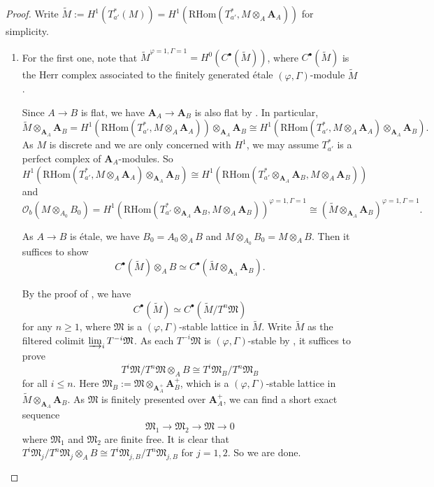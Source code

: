 \documentclass[10pt]{article}
\numberwithin{equation}{section}
\newcommand{\frakM}{{\mathfrak M}}
\newcommand{\calO}{{\mathcal O}}
\newcommand{\bfA}{{\textbf{A}}}
\newcommand{\RHom}{{\mathrm{RHom}}}
\begin{document}
\begin{proof}
Write $\tilde M:=H^1(T^*_{a'}(M))=H^1(\RHom(T^*_{a'},M\otimes_{A}\bfA_A))$ for simplicity.
    \begin{enumerate}
        \item For the first one, note that $\tilde M^{\varphi=1,\Gamma=1}=H^0(C^{\bullet}(\tilde M))$, where $C^{\bullet}(\tilde M)$ is the Herr complex associated to the finitely generated \'etale $(\varphi,\Gamma)$-module $\tilde M$. 
        
        Since $A\to B$ is flat, we have $\bfA_A\to \bfA_B$ is also flat by \cite[Proposition 2.2.4]{EG22}. In particular, 
        \[
      \tilde M\otimes_{\bfA_A}\bfA_B=  H^1(\RHom(T^*_{a'},M\otimes_{A}\bfA_A))\otimes_{\bfA_A}\bfA_B\cong H^1(\RHom(T^*_{a'},M\otimes_{A}\bfA_A)\otimes_{\bfA_A}\bfA_B).
        \]
        As $M$ is discrete and we are only concerned with $H^1$, we may assume $T^*_{a'}$ is a perfect complex of $\bfA_A$-modules. So 
        \[
        H^1(\RHom(T^*_{a'},M\otimes_{A}\bfA_A)\otimes_{\bfA_A}\bfA_B)\cong H^1(\RHom(T^*_{a'}\otimes_{\bfA_A}\bfA_B,M\otimes_{A}\bfA_B))
        \]
   and
        \[
        \calO_b(M\otimes_{A_0}B_0)=H^1(\RHom(T^*_{a'}\otimes_{\bfA_A}\bfA_B,M\otimes_{A}\bfA_B))^{\varphi=1,\Gamma=1}\cong (\tilde M\otimes_{\bfA_A}\bfA_B)^{\varphi=1,\Gamma=1}.
        \]
        
As $A\to B$ is \'etale, we have $B_0=A_0\otimes_AB$ and $M\otimes_{A_0}B_0=M\otimes_AB$. Then it suffices to show 
        \[
        C^{\bullet}(\tilde M)\otimes_AB\simeq  C^{\bullet}(\tilde M\otimes_{\bfA_A}\bfA_B).
        \]

       By the proof of \cite[Theorem 5.1.22]{EG22}, we have
        \[
        C^{\bullet}(\tilde M)\simeq C^{\bullet}(\tilde M/T^n\frakM)
        \]
        for any $n\geq 1$, where $\frakM$ is a $(\varphi,\Gamma)$-stable lattice in $\tilde M$.  Write $\tilde M$ as the filtered colimit $\varinjlim_iT^{-i}\frakM$. As each $T^{-i}\frakM$ is $(\varphi,\Gamma)$-stable by \cite[Lemma 5.1.6]{EG22}, it suffices to prove
        \[
        T^i\frakM/T^n\frakM\otimes_AB\cong T^i\frakM_B/T^n\frakM_B
        \]
        for all $i\leq n$. Here $\frakM_B:=\frakM\otimes_{\bfA_A^+}\bfA_B^+$, which is a $(\varphi,\Gamma)$-stable lattice in $\tilde M\otimes_{\bfA_A}\bfA_B$. As $\frakM$ is finitely presented over $\bfA_A^+$, we can find a short exact sequence
        \[
        \frakM_1\to \frakM_2\to \frakM\to 0
        \]
        where $\frakM_1$ and $\frakM_2$ are finite free. It is clear that $T^i\frakM_j/T^n\frakM_j\otimes_AB\cong T^i\frakM_{j,B}/T^n\frakM_{j,B}$ for $j=1,2$.  So we are done.


\end{enumerate}
\end{proof}
\end{document}
